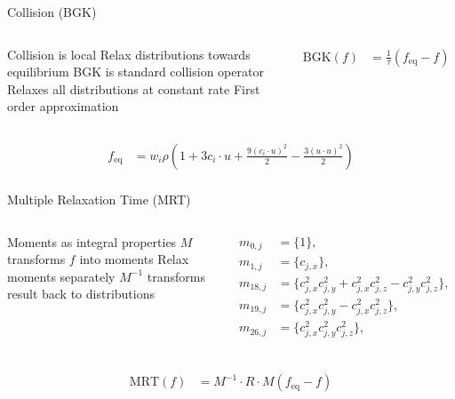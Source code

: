 \begin{frame}{Collision (BGK)}
\begin{columns}
\begin{outline}
\1 Collision is local
\1 Relax distributions towards equilibrium
\1 BGK is standard collision operator
\2 Relaxes all distributions at constant rate
\1 First order approximation
\end{outline}
\begin{center}
\begin{align*}
    \text{BGK}(f) &= \frac{1}{\tau} (f_{\text{eq}} - f)
\end{align*}
\end{center}
\end{columns}
\vspace{1cm}
\begin{align*}
   f_{\text{eq}} &= w_i \rho \left(
1 + 3 c_i \cdot u  + \frac{9 (c_i \cdot u)^2}{2}
- \frac{3 (u \cdot u)^2}{2}\right) \\
\end{align*}
\end{frame}

\begin{frame}{Multiple Relaxation Time (MRT)}
\begin{columns}
\begin{outline}
\1 Moments as integral properties
\1 $M$ transforms $f$ into moments 
\1 Relax moments separately
\1 $M^{-1}$ transforms result back to distributions
\end{outline}
\begin{center}
\begin{align*}
m_{0,j} &= \{  1 \},\\
m_{1,j} &= \{  c_{j,x} \}, \\
m_{18,j} &= \{ c_{j,x}^2 c_{j,y}^2 + c_{j,x}^2 c_{j,z}^2 - c_{j,y}^2 c_{j,z}^2 \}, \\
m_{19,j} &= \{ c_{j,x}^2 c_{j,y}^2 - c_{j,x}^2 c_{j,z}^2 \},\\
m_{26,j} &= \{ c_{j,x}^2 c_{j,y}^2 c_{j,z}^2 \},\\
\end{align*}
\end{center}
\end{columns}
\begin{center}
  \begin{align*}
\text{MRT}(f) &= M^{-1} \cdot R \cdot M(f_{\text{eq}} - f)
  \end{align*}
\end{center}
\end{frame}


